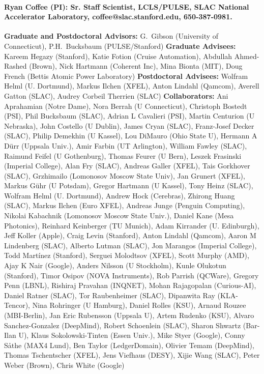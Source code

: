 \documentclass{article}
\begin{document}
\break

\paragraph{Ryan Coffee (PI): Sr. Staff Scientist, LCLS/PULSE, SLAC National Accelerator Laboratory, coffee@slac.stanford.edu, 650-387-0981. }
\textbf{Graduate and Postdoctoral Advisors: } G.~Gibson (University of Connecticut), P.H.~Bucksbaum (PULSE/Stanford)
\textbf{Graduate Advisees: } Kareem Hegazy (Stanford), Katie Fotion (Cruise Automation), Abdullah Ahmed-Rashed (Brown), Nick Hartmann (Coherent Inc), Mina Bionta (MIT), Doug French (Bettis Atomic Power Laboratory)
\textbf{Postdoctoral Advisees: } Wolfram Helml (U. Dortmund), Markus Ilchen (XFEL), Anton Lindahl (Qamcom), Averell Gatton (SLAC), Audrey Corbeil Therrien (SLAC)
\textbf{Collaborators: }
Ani Aprahamian (Notre Dame), Nora Berrah (U Connecticut), Christoph Bostedt (PSI), Phil Bucksbaum (SLAC), Adrian L Cavalieri (PSI), Martin Centurion (U Nebraska), John Costello (U Dublin), James Cryan (SLAC), Franz-Josef Decker (SLAC), Philip Demekhin (U Kassel), Lou DiMauro (Ohio State U), Hermann A Dürr (Uppsala Univ.), Amir Farbin (UT Arlington), William Fawley (SLAC), Raimund Feifel (U Gothenburg), Thomas Feurer (U Bern), Leszek Frasinski (Imperial College), Alan Fry (SLAC), Andreas Galler (XFEL), Tais Gorkhover (SLAC), Grzhimailo (Lomonosov Moscow State Univ), Jan Grunert (XFEL), Markus Gühr (U Potsdam), Gregor Hartmann (U Kassel), Tony Heinz (SLAC), Wolfram Helml (U. Dortmund), Andrew Hock (Cerebras), Zhirong Huang (SLAC), Markus Ilchen (Euro XFEL), Andreas Junge (Penguin Computing), Nikolai Kabachnik (Lomonosov Moscow State Univ.), Daniel Kane (Mesa Photonics), Reinhard Keinberger (TU Munich), Adam Kirrander (U. Edinburgh), Jeff Koller (Apple), Craig Levin (Stanford), Anton Lindahl (Qamcom), Aaron M Lindenberg (SLAC), Alberto Lutman (SLAC), Jon Marangos (Imperial College), Todd Martínez (Stanford), Serguei Molodtsov (XFEL), Scott Murphy (AMD), Ajay K Nair (Google), Anders Nilsson (U Stockholm), Kunle Olukotun (Stanford), Timor Osipov (NOVA Instruments), Rob Parrish (QCWare), Gregory Penn (LBNL), Rishiraj Pravahan (INQNET), Mohan Rajagopalan (Curious-AI), Daniel Ratner (SLAC), Tor Raubenheimer (SLAC), Dipanwita Ray (KLA-Tencor), Nina Rohringer (U Hamburg), Daniel Rolles (KSU), Arnaud Rouzee (MBI-Berlin), Jan Eric Rubensson (Uppsala U), Artem Rudenko (KSU), Alvaro Sanchez-Gonzalez (DeepMind), Robert Schoenlein (SLAC), Sharon Shwartz (Bar-Ilan U), Klaus Sokolowski-Tinten (Essen Univ.), Mike Styer (Google), Conny Såthe (MAX4 Lund), Ben Taylor (LedgerDomain), Olivier Temam (DeepMind), Thomas Tschentscher (XFEL), Jens Viefhaus (DESY), Xijie Wang (SLAC), Peter Weber (Brown), Chris White (Google) 
\end{document}
